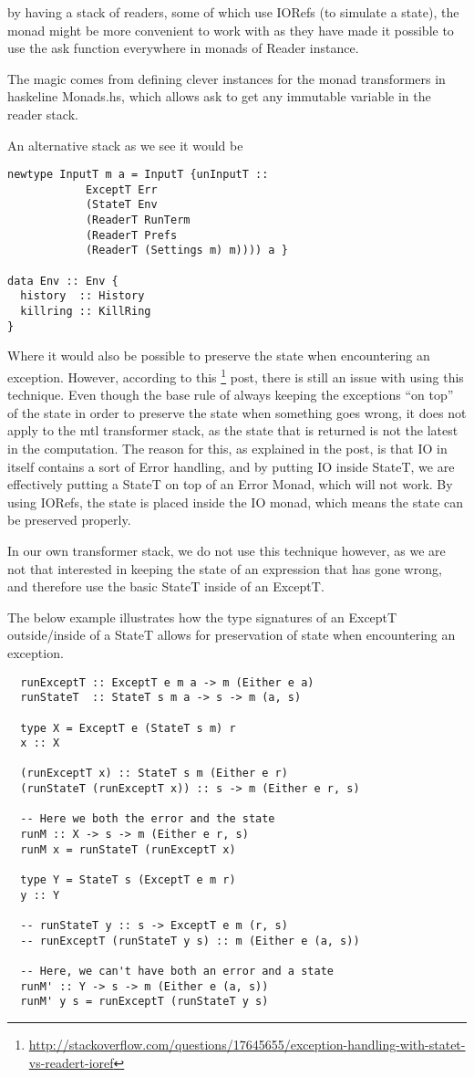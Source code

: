 \documentclass[11pt,a4paper]{article}
\begin{document}
by having a stack of readers, some of which use IORefs (to simulate a state), the
monad might be more convenient to work with as they have made it possible to
use the ask function everywhere in monads of Reader instance.

The magic comes from defining clever instances for the monad transformers in
haskeline Monads.hs, which allows ask to get any immutable variable in the
reader stack.

An alternative stack as we see it would be

\begin{verbatim}
newtype InputT m a = InputT {unInputT ::
            ExceptT Err
            (StateT Env
            (ReaderT RunTerm
            (ReaderT Prefs
            (ReaderT (Settings m) m)))) a }

data Env :: Env {
  history  :: History
  killring :: KillRing
}
\end{verbatim}

Where it would also be possible to preserve the state when encountering an
exception. However, according to this
\footnote{\url{http://stackoverflow.com/questions/17645655/exception-handling-with-statet-vs-readert-ioref}}
post, there is still an issue with using this technique. Even though the base
rule of always keeping the exceptions ``on top'' of the state in order to
preserve the state when something goes wrong, it does not apply to the mtl
transformer stack, as the state that is returned is not the latest in the
computation. The reason for this, as explained in the post, is that IO in
itself contains a sort of Error handling, and by putting IO inside StateT, we
are effectively putting a StateT on top of an Error Monad, which will not work.
By using IORefs, the state is placed inside the IO monad, which means the state
can be preserved properly.

In our own transformer stack, we do not use this technique however, as we are
not that interested in keeping the state of an expression that has gone wrong,
and therefore use the basic StateT inside of an ExceptT.

The below example illustrates how the type signatures of an ExceptT
outside/inside of a StateT allows for preservation of state when encountering
an exception.

\begin{verbatim}
  runExceptT :: ExceptT e m a -> m (Either e a)
  runStateT  :: StateT s m a -> s -> m (a, s)

  type X = ExceptT e (StateT s m) r
  x :: X

  (runExceptT x) :: StateT s m (Either e r)
  (runStateT (runExceptT x)) :: s -> m (Either e r, s)

  -- Here we both the error and the state
  runM :: X -> s -> m (Either e r, s)
  runM x = runStateT (runExceptT x)

  type Y = StateT s (ExceptT e m r)
  y :: Y

  -- runStateT y :: s -> ExceptT e m (r, s)
  -- runExceptT (runStateT y s) :: m (Either e (a, s))

  -- Here, we can't have both an error and a state
  runM' :: Y -> s -> m (Either e (a, s))
  runM' y s = runExceptT (runStateT y s)
\end{verbatim}
\end{document}
